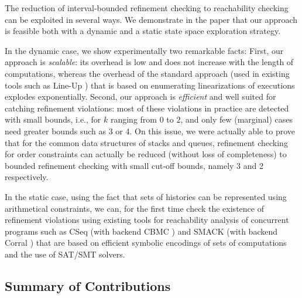 The reduction of interval-bounded refinement checking to reachability checking
can be exploited in several ways. We demonstrate in the paper that our approach
is feasible both with a dynamic and a static state space exploration strategy.

In the dynamic case, we show experimentally two remarkable facts: First, our
approach is \emph{scalable}: its overhead is low and does not increase with the
length of computations, whereas the overhead of the standard approach (used in
existing tools such as Line-Up \cite{}) that is based on enumerating
linearizations of executions explodes exponentially. Second, our approach is
\emph{efficient} and well suited for catching refinement violations: most of
these violations in practice are detected with small bounds, i.e., for $k$
ranging from 0 to $2$, and only few (marginal) cases need greater bounds such
as 3 or 4. On this issue, we were actually able to prove that for the common
data structures of stacks and queues, refinement checking for order constraints
can actually be reduced (without loss of completeness) to bounded refinement
checking with small cut-off bounds, namely 3 and 2 respectively.

In the static case, using the fact that sets of histories can be represented
using arithmetical constraints, we can, for the first time check the existence
of refinement violations using existing tools for reachability analysis of
concurrent programs such as CSeq \cite{} (with backend CBMC \cite{}) and SMACK
\cite{} (with backend Corral \cite{}) that are based on efficient symbolic
encodings of sets of computations and the use of SAT/SMT solvers.

\subsection{Summary of Contributions}

